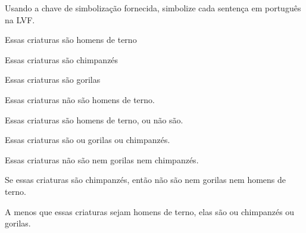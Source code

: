 \practiceproblems
\solutions
\problempart Usando a chave de simbolização fornecida, simbolize cada sentença em português na LVF.\label{pr.monkeysuits}
	\begin{ekey}
		\item[M] Essas criaturas são homens de terno
		\item[C] Essas criaturas são chimpanzés
		\item[G] Essas criaturas são gorilas
	\end{ekey}
\begin{compactlist}
\item Essas criaturas não são homens de terno.
\item Essas criaturas são homens de terno, ou não são.
\item Essas criaturas são ou gorilas ou chimpanzés.
\item Essas criaturas não são nem gorilas nem chimpanzés.
\item Se essas criaturas são chimpanzés, então não são nem gorilas nem homens de terno.
\item A menos que essas criaturas sejam homens de terno, elas são ou chimpanzés ou gorilas.
\end{compactlist}

